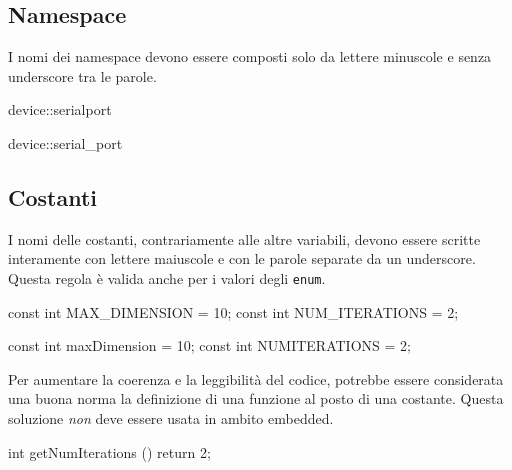 \subsection{Namespace}\label{ssec:namespacename}

I nomi dei namespace devono essere composti solo da lettere minuscole e senza underscore tra le parole\cite{codestyle:geotechnical}.

\noindent\begin{minipage}[t]{\cbwidth}
\begin{RightCode}
device::serialport
\end{RightCode}
\end{minipage}%
\hspace{\cbdistance}
\begin{minipage}[t]{\cbwidth}
\begin{ErrorCode}
device::serial_port
\end{ErrorCode}
\end{minipage}

\subsection{Costanti}\label{ssec:constantname}

I nomi delle costanti, contrariamente alle altre variabili, devono essere scritte interamente con lettere maiuscole e con le parole separate da un underscore\cite{codestyle:geotechnical}.
Questa regola è valida anche per i valori degli \texttt{enum}.

\noindent\begin{minipage}[t]{\cbwidth}
\begin{RightCode}
const int MAX_DIMENSION = 10;
const int NUM_ITERATIONS = 2;
\end{RightCode}
\end{minipage}%
\hspace{\cbdistance}
\begin{minipage}[t]{\cbwidth}
\begin{ErrorCode}
const int maxDimension = 10;
const int NUMITERATIONS = 2;
\end{ErrorCode}
\end{minipage}

Per aumentare la coerenza e la leggibilità del codice, potrebbe essere considerata una buona norma la definizione di una funzione al posto di una costante\cite{codestyle:geotechnical}.
Questa soluzione \emph{non} deve essere usata in ambito embedded.

\noindent\begin{minipage}[t]{\rbwidth}
\begin{RightCode}
int
getNumIterations ()
{
	return 2;
}
\end{RightCode}
\end{minipage}

